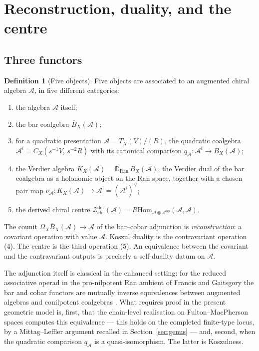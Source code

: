 \documentclass[11pt]{amsart}
\numberwithin{equation}{section}
\theoremstyle{plain}
\theoremstyle{definition}
\newtheorem{definition}[theorem]{Definition}
\theoremstyle{remark}
\newcommand{\cA}{\mathcal{A}}
\newcommand{\cZ}{\mathcal{Z}}
\newcommand{\Ran}{\mathrm{Ran}}
\newcommand{\barB}{\overline{B}}
\begin{document}
\section{Reconstruction, duality, and the centre}\label{sec:koszul}

\subsection{Three functors}

\begin{definition}[Five objects]\label{conv:firewall}
Five objects are associated to an augmented chiral algebra $\cA$, in
five different categories:
\begin{enumerate}
\item the algebra $\cA$ itself;
\item the bar coalgebra $\barB_X(\cA)$;
\item for a quadratic presentation $\cA=T_X(V)/(R)$, the quadratic
coalgebra $\cA^{i}=C_X(s^{-1}V,\,s^{-2}R)$ with its canonical comparison
$q_{\cA}\colon\cA^{i}\to\barB_X(\cA)$;
\item the Verdier algebra
$K_X(\cA)=\mathbb{D}_{\Ran}\,\barB_X(\cA)$, the Verdier dual of the bar
coalgebra as a holonomic object on the Ran space, together with a chosen
pair map $\nu_{\cA}\colon K_X(\cA)\to\cA^{!}=(\cA^{i})^{\vee}$;
\item the derived chiral centre
$\cZ^{\mathrm{der}}_{\mathrm{ch}}(\cA)
=R\mathrm{Hom}_{\cA\otimes\cA^{\mathrm{op}}}(\cA,\cA)$.
\end{enumerate}
The counit $\Omega_X\barB_X(\cA)\to\cA$ of the bar--cobar adjunction is
\emph{reconstruction}: a covariant operation with value $\cA$. Koszul
duality is the contravariant operation (4). The centre is the third
operation (5). An equivalence between the covariant and the
contravariant outputs is precisely a self-duality datum on $\cA$.
\end{definition}

The adjunction itself is classical in the enhanced setting: for the reduced
associative operad in the pro-nilpotent Ran ambient of Francis and Gaitsgory
the bar and cobar functors are mutually inverse equivalences between
augmented algebras and conilpotent coalgebras \cite{FG}. What requires proof
in the present geometric model is, first, that the chain-level realisation
on Fulton--MacPherson spaces computes this equivalence --- this holds on the
completed finite-type locus, by a Mittag--Leffler argument recalled in
Section~\ref{sec:genus} --- and, second, when the quadratic comparison
$q_{\cA}$ is a quasi-isomorphism. The latter is Koszulness.
\end{document}
